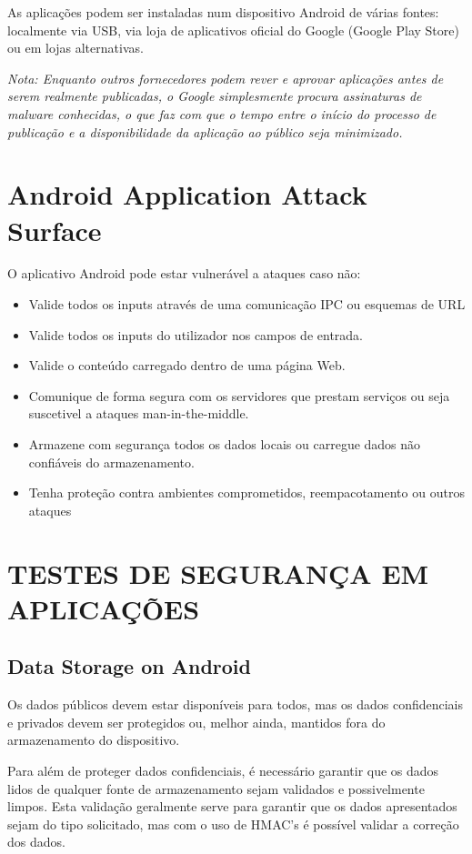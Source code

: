 As aplicações podem ser instaladas num dispositivo Android de várias fontes: localmente via USB, via loja de aplicativos oficial do Google (Google Play Store) ou em lojas alternativas.
\\

\par \textit{Nota: Enquanto outros fornecedores podem rever e aprovar aplicações antes de serem realmente publicadas, o Google simplesmente procura assinaturas de malware conhecidas, o que faz com que o tempo entre o início do processo de publicação e a disponibilidade da aplicação ao público seja minimizado.}


\newpage
\section{Android Application Attack Surface}
O aplicativo Android pode estar vulnerável a ataques caso não:
\begin{itemize}
    \item Valide todos os inputs através de uma comunicação IPC ou esquemas de URL
    \item Valide todos os inputs do utilizador nos campos de entrada.
    \item Valide o conteúdo carregado dentro de uma página Web.
    \item Comunique de forma segura com os servidores que prestam serviços ou seja suscetivel a ataques man-in-the-middle.
    \item Armazene com segurança todos os dados locais ou carregue dados não confiáveis do armazenamento.
    \item Tenha proteção contra ambientes comprometidos, reempacotamento ou outros ataques
\end{itemize}



\section{TESTES DE SEGURANÇA EM APLICAÇÕES}

\subsection{Data Storage on Android}
Os dados públicos devem estar disponíveis para todos, mas os dados confidenciais e privados devem ser protegidos ou, melhor ainda, mantidos fora do armazenamento do dispositivo.

Para além de proteger dados confidenciais, é necessário garantir que os dados lidos de qualquer fonte de armazenamento sejam validados e possivelmente limpos. Esta validação geralmente serve para garantir que os dados apresentados sejam do tipo solicitado, mas com o uso de HMAC's é possível validar a correção dos dados.


